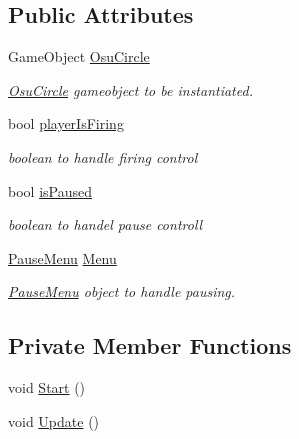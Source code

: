 \subsection*{Public Attributes}
\begin{DoxyCompactItemize}
\item 
\mbox{\label{class_game_controller_ae49cd9c319e5d5ad8e4346f74fcd1ab4}} 
Game\+Object \hyperlink{class_game_controller_ae49cd9c319e5d5ad8e4346f74fcd1ab4}{Osu\+Circle}
\begin{DoxyCompactList}\small\item\em \hyperlink{class_osu_circle}{Osu\+Circle} gameobject to be instantiated. \end{DoxyCompactList}\item 
\mbox{\label{class_game_controller_a3ce5989e4c40bdf139e70c9985559a78}} 
bool \hyperlink{class_game_controller_a3ce5989e4c40bdf139e70c9985559a78}{player\+Is\+Firing}
\begin{DoxyCompactList}\small\item\em boolean to handle firing control \end{DoxyCompactList}\item 
\mbox{\label{class_game_controller_a4f83ac6f51abe164a979acdf01318905}} 
bool \hyperlink{class_game_controller_a4f83ac6f51abe164a979acdf01318905}{is\+Paused}
\begin{DoxyCompactList}\small\item\em boolean to handel pause controll \end{DoxyCompactList}\item 
\mbox{\label{class_game_controller_aef62bc59c2244238483cb489b74352ac}} 
\hyperlink{class_pause_menu}{Pause\+Menu} \hyperlink{class_game_controller_aef62bc59c2244238483cb489b74352ac}{Menu}
\begin{DoxyCompactList}\small\item\em \hyperlink{class_pause_menu}{Pause\+Menu} object to handle pausing. \end{DoxyCompactList}\end{DoxyCompactItemize}
\subsection*{Private Member Functions}
\begin{DoxyCompactItemize}
\item 
void \hyperlink{class_game_controller_a97788a7aa0f09c8d748781683e5f045b}{Start} ()
\item 
void \hyperlink{class_game_controller_a5a89277529cadb49af7d55eba3bbf056}{Update} ()
\end{DoxyCompactItemize}
